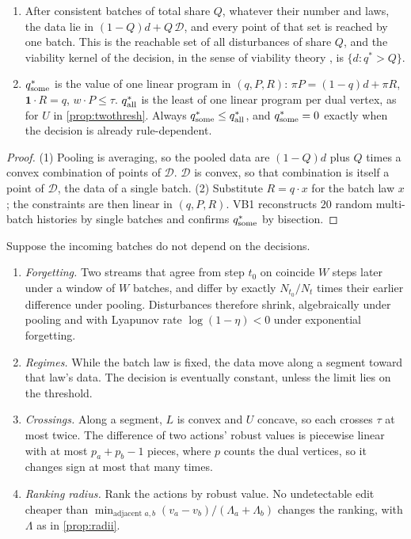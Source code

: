 \documentclass[11pt]{article}
\theoremstyle{definition}\newtheorem{definition}[theorem]{Definition}\newtheorem{remark}[theorem]{Remark}\newtheorem{example}[theorem]{Example}\newtheorem{problem}[theorem]{Open problem}\crefname{problem}{Problem}{Problems}
\begin{document}
\begin{proposition}\label{prop:viable}
\begin{enumerate}
\item[(1)] After consistent batches of total share $Q$, whatever their number and laws, the data lie in $(1-Q)d+Q\,\mathcal D$, and every point of that set is reached by one batch. This is the reachable set of all disturbances of share $Q$, and the viability kernel of the decision, in the sense of viability theory \cite{Aubin1991}, is $\{d:q^*>Q\}$.
\item[(2)] $q^*_{\rm some}$ is the value of one linear program in $(q,P,R)$: $\pi P=(1-q)d+\pi R$, $\mathbf 1\cdot R=q$, $w\cdot P\le\tau$. $q^*_{\rm all}$ is the least of one linear program per dual vertex, as for $U$ in \cref{prop:twothresh}. Always $q^*_{\rm some}\le q^*_{\rm all}$, and $q^*_{\rm some}=0$ exactly when the decision is already rule-dependent.
\end{enumerate}
\end{proposition}

\begin{proof}
(1) Pooling is averaging, so the pooled data are $(1-Q)d$ plus $Q$ times a convex combination of points of $\mathcal D$. $\mathcal D$ is convex, so that combination is itself a point of $\mathcal D$, the data of a single batch. (2) Substitute $R=q\cdot x$ for the batch law $x$; the constraints are then linear in $(q,P,R)$. VB1 reconstructs $20$ random multi-batch histories by single batches and confirms $q^*_{\rm some}$ by bisection.
\end{proof}

\begin{proposition}\label{prop:openloop}
Suppose the incoming batches do not depend on the decisions.
\begin{enumerate}
\item[(1)] \emph{Forgetting.} Two streams that agree from step $t_0$ on coincide $W$ steps later under a window of $W$ batches, and differ by exactly $N_{t_0}/N_t$ times their earlier difference under pooling. Disturbances therefore shrink, algebraically under pooling and with Lyapunov rate $\log(1-\eta)<0$ under exponential forgetting.
\item[(2)] \emph{Regimes.} While the batch law is fixed, the data move along a segment toward that law's data. The decision is eventually constant, unless the limit lies on the threshold.
\item[(3)] \emph{Crossings.} Along a segment, $L$ is convex and $U$ concave, so each crosses $\tau$ at most twice. The difference of two actions' robust values is piecewise linear with at most $p_a+p_b-1$ pieces, where $p$ counts the dual vertices, so it changes sign at most that many times.
\item[(4)] \emph{Ranking radius.} Rank the actions by robust value. No undetectable edit cheaper than $\min_{\text{adjacent }a,b}(v_a-v_b)/(\Lambda_a+\Lambda_b)$ changes the ranking, with $\Lambda$ as in \cref{prop:radii}.
\end{enumerate}
\end{proposition}
\end{document}
